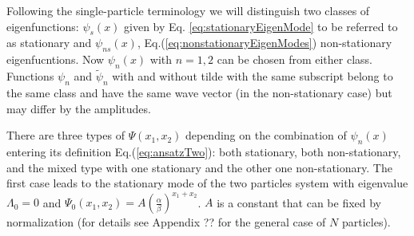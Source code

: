 \documentclass[aps,showpacs,twocolumn,floatfix,prx,superscriptaddress]{revtex4-1}
\begin{document}
Following the single-particle terminology we will distinguish two classes of eigenfunctions: $\psi_s(x)$ given by Eq. \eqref{eq:stationaryEigenMode} to be referred to as stationary and $\psi_{ns}(x)$, Eq.(\ref{eq:nonstationaryEigenModes}) non-stationary eigenfucntions. Now $\psi_n(x)$ with $n=1,2$ can be chosen from either class. Functions $\psi_n$ and  $\tilde{\psi}_n$  with and without tilde with the same subscript belong to the same class and have the same wave vector (in the non-stationary case) but may differ by the amplitudes. %

There are three types of $\Psi(x_1, x_2)$ depending on the combination of $\psi_n(x)$ entering its definition Eq.(\ref{eq:ansatzTwo}): both stationary, both non-stationary, and the mixed type with one stationary and the other one non-stationary. The first case leads to the stationary mode of the two particles system with eigenvalue $\Lambda_0 = 0$ and $\Psi_0(x_1, x_2) = A \left(\frac{\alpha}{\beta}\right)^{x_1+x_2}$. $A$ is a constant that can be fixed by normalization (for details see Appendix ?? for the general case of $N$ particles).
\end{document}
